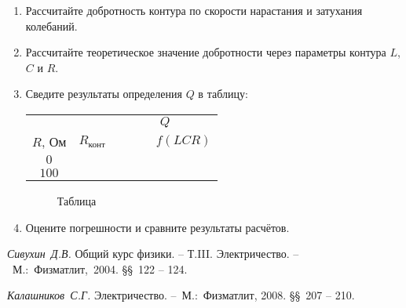 \begin{lab:task}
\begin{enumerate}
	\item Рассчитайте добротность контура по скорости нарастания и затухания
колебаний.

	\item Рассчитайте теоретическое значение добротности через параметры
контура $L$, $C$ и $R$.

	\item Сведите результаты определения $Q$ в таблицу:

	\begin{center}
\begin{tabular}{|c|c|c|c|c|c|}
\hline
& & \multicolumn{4}{c|}{$Q$}\\
\cline{3-6}
$R$, Ом & $R_{\text{конт}}$ & & & &$f(LCR)$\\
\hline
$0$ & & & & & \\
$100$ & & & & &\\
\hline
\end{tabular}
\end{center}

\begin{figure}[h!]
	\centering
	\caption{Таблица}
\end{figure}

	\item Оцените погрешности и сравните результаты расчётов.
	\end{enumerate}
\end{lab:task}


\begin{lab:literature}
	\item \emph{Сивухин~Д.В.} Общий курс физики. -- Т.III. Электричество. -- ~М.:~Физматлит,~2004. \S\S~122 -- 124.

	\item \emph{Калашников~С.Г.} Электричество. --~М.:~Физматлит, 2008. \S\S~207 -- 210.
\end{lab:literature}
